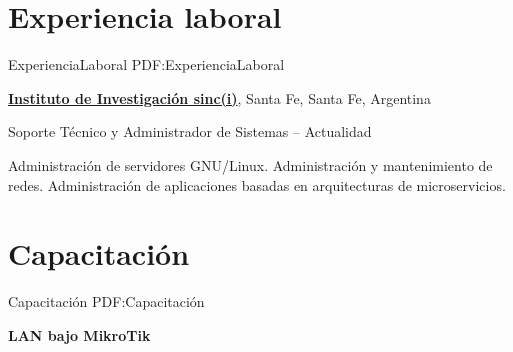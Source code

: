 \documentclass[letterpaper,MMMyyyy,nonstop]{simpleresumecv}
\begin{document}
\begin{body}

%
%


\section
{Experiencia\newline
laboral}
{ExperienciaLaboral}
{PDF:ExperienciaLaboral}

\href{http://www.sinc.unl.edu.ar}
{\textbf{Instituto de Investigación sinc(i)}},
Santa Fe, Santa Fe, Argentina

\GapNoBreak
\BulletItem
Soporte Técnico y Administrador de Sistemas
\hfill
{} --
Actualidad
\begin{detail}
\SubBulletItem
Administración de servidores GNU/Linux.
\SubBulletItem
Administración y mantenimiento de redes.
\SubBulletItem
Administración de aplicaciones basadas en arquitecturas de microservicios.
\end{detail}


\section
{Capacitación}
{Capacitación}
{PDF:Capacitación}

\textbf{LAN bajo MikroTik}
\hfill
{}


\end{body}
\end{document}
